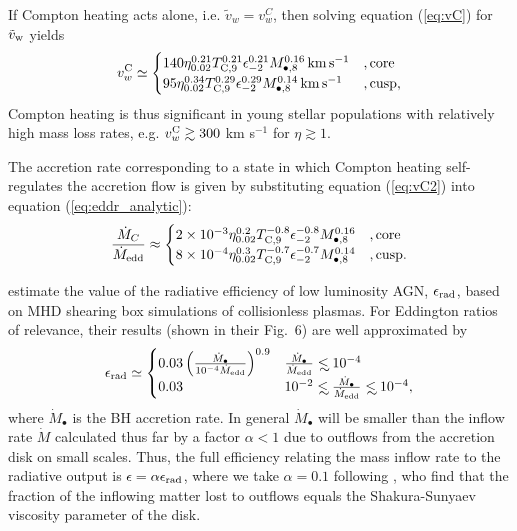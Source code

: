 \documentclass[usenatbib,fleqn]{mn2e}
\newcommand\lsim{\mathrel{\rlap{\lower4pt\hbox{\hskip1pt$\sim$}}
    \raise1pt\hbox{$<$}}}
\begin{document}
If Compton heating acts alone, i.e. $\tilde{v}_{w} = v_{w}^{C}$, then
solving equation (\ref{eq:vC}) for $\tilde{v}_{\rm w}$ yields
\begin{align} v_{w}^{\rm C} \simeq
  \begin{cases} 140 \eta_{0.02}^{0.21}T_{\rm
C,9}^{0.21}\epsilon_{-2}^{0.21} M_{\bullet,8}^{0.16}\,{\rm km\,s^{-1}}
&, \text{core}\\ 95 \eta_{0.02}^{0.34}T_{\rm
C,9}^{0.29}\epsilon_{-2}^{0.29} M_{\bullet,8}^{0.14}\,{\rm km\,s^{-1}}
&, \text{cusp},
  \end{cases}
  \label{eq:vC2}
\end{align} 
Compton heating is thus significant in young stellar populations
with relatively high mass loss rates, e.g. $v_{w}^{\rm C} \gtrsim 300$
km s$^{-1}$ for $\eta \gtrsim 1$.  

The accretion rate corresponding to a state in which Compton heating
self-regulates the accretion flow is given by substituting equation
(\ref{eq:vC2}) into equation (\ref{eq:eddr_analytic}):
\begin{align}
\frac{\dot{M}_{C}}{\dot{M}_{\rm edd}} \approx 
\begin{cases} 2\times 10^{-3} \eta_{0.02}^{0.2}T_{\rm
C,9}^{-0.8}\epsilon_{-2}^{-0.8} M_{\bullet,8}^{0.16}
&, \text{core}\\ 8\times 10^{-4} \eta_{0.02}^{0.3}T_{\rm
C,9}^{-0.7}\epsilon_{-2}^{-0.7} M_{\bullet,8}^{0.14}
&, \text{cusp}.
  \end{cases}
  \label{eq:MdotCa}
\end{align}

\citet{Sharma+2007} estimate the value of the radiative efficiency of
low luminosity AGN, $\epsilon_{\rm rad}$, based on MHD shearing box
simulations of collisionless plasmas.  For Eddington ratios of
relevance, their results (shown in their Fig.~6) are well approximated
by
\begin{align}
\epsilon_{\rm rad} \simeq 
\begin{cases}
  0.03 \left(\frac{\dot{M}_{\bullet}}{10^{-4}\dot{M}_{\rm edd}}\right)^{0.9} & \frac{\dot{M}_{\bullet}}{\dot{M}_{\rm edd}} \lsim 10^{-4} \\
 0.03 &  10^{-2} \lsim \frac{\dot{M}_{\bullet}}{\dot{M}_{\rm edd}} \lsim  10^{-4},
\end{cases}
\label{eq:efficiency}
\end{align}
where $\dot{M}_{\bullet}$ is the BH accretion rate. In general
$\dot{M}_{\bullet}$ will be smaller than the inflow rate $\dot{M}$
calculated thus far by a factor $\alpha < 1$ due to outflows from the
accretion disk on small scales.  Thus, the full efficiency relating
the mass inflow rate to the radiative output is $\epsilon = \alpha
\epsilon_{\rm rad}$, where we take $\alpha = 0.1$ following
\citet{Li+2013}, who find that the fraction of the inflowing matter
lost to outflows equals the Shakura-Sunyaev viscosity parameter of the
disk.
\end{document}
